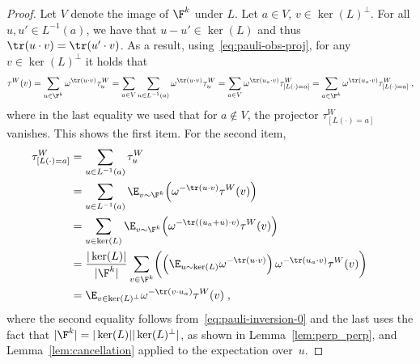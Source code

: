 \begin{proof}
  Let $V$ denote the image of $\F^k$ under $L$.
  Let $a\in V$, $v \in \ker(L)^\perp$.
  For all $u, u' \in L^{-1}(a)$, we have that $u-u'\in \ker(L)$ and thus $\tr(u
  \cdot v) = \tr(u' \cdot v)$.
  As a result, using~\eqref{eq:pauli-obs-proj}, for any $v\in\ker(L)^\perp$ it
  holds that
  \begin{equation*}
    \tau^W(v)
    = \sum_{u \in \F^k} \omega^{\tr(u \cdot v)} \tau^W_u
    = \sum_{a \in V} \sum_{u \in L^{-1}(a)} \omega^{\tr(u \cdot v)} \tau^W_u
    = \sum_{a \in V} \omega^{\tr(u_a \cdot v)} \tau^W_{[L(\cdot)=a]}
    = \sum_{a \in \F^k} \omega^{\tr(u_a \cdot v)} \tau^W_{[L(\cdot)=a]}\;,
  \end{equation*}
  where in the last equality we used that for $a \notin V$, the projector
  $\tau^W_{[L(\cdot)=a]}$ vanishes.
  This shows the first item.
  For the second item,
  \begin{align*}
    \tau^W_{[L(\cdot)=a]}
    & = \sum_{u  \in L^{-1}(a)} \tau^W_u\\
    & =  \sum_{u  \in L^{-1}(a)} \E_{v \sim \F^k} \Bigl(
      \omega^{-\tr(u \cdot v)} \tau^W(v) \Bigr) && \\
    & =  \sum_{u \in \ker(L)} \E_{v \sim \F^k} \Bigl(
      \omega^{-\tr((u_a + u) \cdot v)} \tau^W(v) \Bigr)\\
    & = \frac{|\ker(L)|}{|\F^k|} \sum_{v \in \F^k} \biggl( \Big(
      \E_{u \sim \ker(L)} \omega^{-\tr(u \cdot v)} \Big)\,
      \omega^{-\tr(u_a \cdot v)}  \tau^W(v) \biggr)\\
    & = \E_{v \in \ker(L)^\perp} \omega^{-\tr(v \cdot u_a)} \tau^W(v)\;,
\end{align*}
where the second equality follows from~\eqref{eq:pauli-inversion-0} and the last
uses the fact that $|\F^k|=|\ker(L)||\ker(L)^\perp|$, as shown in
Lemma~\ref{lem:perp_perp}, and Lemma~\ref{lem:cancellation} applied to the
expectation over~$u$.
\end{proof}


